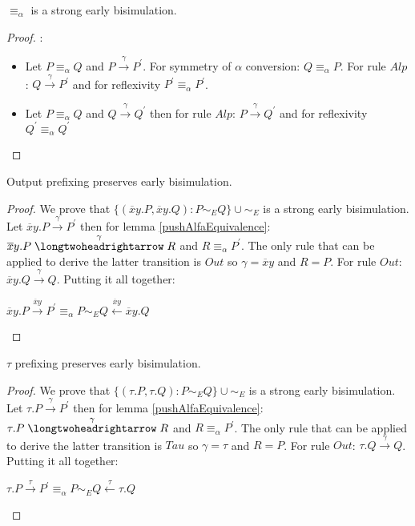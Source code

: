 \begin{proposition}
  $\equiv_{\alpha}$ is a strong early bisimulation.
  \begin{proof}:
    \begin{itemize}
      \item
	Let $P\equiv_{\alpha} Q$ and $P\xrightarrow{\gamma}P^{'}$. For symmetry of $\alpha$ conversion: $Q\equiv_{\alpha}P$. For rule $Alp$: $Q\xrightarrow{\gamma}P^{'}$ and for reflexivity $P^{'}\equiv_{\alpha}P^{'}$.
      \item
	Let $P\equiv_{\alpha} Q$ and $Q\xrightarrow{\gamma}Q^{'}$ then for rule $Alp$: $P\xrightarrow{\gamma}Q^{'}$ and for reflexivity $Q^{'}\equiv_{\alpha}Q^{'}$
    \end{itemize}
  \end{proof}
\end{proposition}


\begin{lemma}
  Output prefixing preserves early bisimulation. 
  \begin{proof}
    We prove that $\{(\overline{x}y.P, \overline{x}y.Q): P\sim_{E}Q\}\cup \sim_{E}$ is a strong early bisimulation. Let $\overline{x}y.P\xrightarrow{\gamma}P^{'}$ then for lemma \ref{pushAlfaEquivalence}: $\overline{x}y.P\stackrel{\gamma}{\longtwoheadrightarrow} R$ and $R\equiv_{\alpha}P^{'}$. The only rule that can be applied to derive the latter transition is $Out$ so $\gamma = \overline{x}y$ and $R=P$. For rule $Out$: $\overline{x}y.Q\xrightarrow{\gamma} Q$. Putting it all together: 
    \begin{center}
      $\overline{x}y.P\xrightarrow{\overline{x}y}P^{'} \equiv_{\alpha} P \sim_{E} Q \stackrel{\overline{x}y}{\longleftarrow} \overline{x}y.Q$
    \end{center}
  \end{proof}
\end{lemma}


\begin{lemma}
  $\tau$ prefixing preserves early bisimulation. 
  \begin{proof}
    We prove that $\{(\tau.P, \tau.Q): P\sim_{E}Q\}\cup \sim_{E}$ is a strong early bisimulation. Let $\tau.P\xrightarrow{\gamma}P^{'}$ then for lemma \ref{pushAlfaEquivalence}: $\tau.P\stackrel{\gamma}{\longtwoheadrightarrow} R$ and $R\equiv_{\alpha}P^{'}$. The only rule that can be applied to derive the latter transition is $Tau$ so $\gamma = \tau$ and $R=P$. For rule $Out$: $\tau.Q\xrightarrow{\gamma} Q$. Putting it all together: 
    \begin{center}
      $\tau.P\xrightarrow{\tau}P^{'} \equiv_{\alpha} P \sim_{E} Q \stackrel{\tau}{\longleftarrow} \tau.Q$
    \end{center}
  \end{proof}
\end{lemma}


